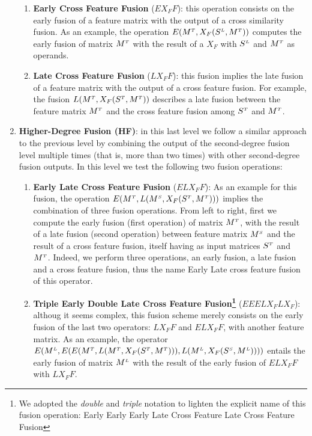 \begin{enumerate}
\begin{enumerate}
%
\item \textbf{Early Cross Feature Fusion} ($EX_FF$):  this operation consists on the early fusion of a feature matrix with the output of a cross similarity fusion. As an example, the operation $E(M^{\scriptscriptstyle T},X_F(S^{\scriptscriptstyle L}, M^{\scriptscriptstyle T}))$ computes the early fusion of matrix $M^{\scriptscriptstyle T}$ with the result of a $X_F$ with $S^{\scriptscriptstyle L}$ and $M^{\scriptscriptstyle T}$ as operands. 
%

\item \textbf{Late Cross Feature Fusion} ($LX_FF$): this fusion implies the late fusion of a feature matrix with the output of a cross feature fusion. For example, the fusion $L(M^{\scriptscriptstyle T}, X_F(S^{\scriptscriptstyle T}, M^{\scriptscriptstyle T}))$ describes a late fusion between the feature matrix $M^{\scriptscriptstyle T}$ and the cross feature fusion among $S^{\scriptscriptstyle T}$ and $M^{\scriptscriptstyle T}$.
\end{enumerate}

\item \textbf{Higher-Degree Fusion (HF)}: in this last level we follow a similar approach to the previous level by combining the output of the second-degree fusion level multiple times (that is, more than two times) with other second-degree fusion outputs. In this level we test the following two fusion operations:
\begin{enumerate}
\item \textbf{Early Late Cross Feature Fusion} ($ELX_FF$): As an example for this fusion, the operation $E(M^{\scriptscriptstyle T}, \allowbreak L(M^{\scriptscriptstyle S}, X_F(S^{\scriptscriptstyle T}, M^{\scriptscriptstyle T})))$ implies the combination of three fusion operations. From left to right, first we compute the early fusion (first operation) of  matrix $M^{\scriptscriptstyle T}$, with the result of a late fusion (second operation) between feature matrix $M^{\scriptscriptstyle S}$ and the result of a cross feature fusion, itself having as input matrices $S^{\scriptscriptstyle T}$ and $M^{\scriptscriptstyle T}$. Indeed, we perform three operations, an early fusion, a late fusion and a cross feature fusion, thus the name Early Late cross feature fusion of this operator.
\item \textbf{Triple Early Double Late Cross Feature Fusion\footnote{We adopted the \textit{double} and \textit{triple} notation to lighten the explicit name of this fusion operation: Early Early Early Late Cross Feature Late Cross Feature Fusion}}
 ($EEELX_FLX_F$): althoug it seems complex, this fusion scheme merely consists on the early fusion of the last two operators: $LX_FF$ and $ELX_FF$, with another feature matrix. As an example, the operator  $E(M^{\scriptscriptstyle L}, E(E(M^{\scriptscriptstyle T},  L(M^{\scriptscriptstyle T}, X_F(S^{\scriptscriptstyle T}, M^{\scriptscriptstyle T}))),\allowbreak L(M^{\scriptscriptstyle L}, X_F(S^{\scriptscriptstyle S}, M^{\scriptscriptstyle L}))))$ entails the early fusion of matrix $M^{\scriptscriptstyle L}$ with the result of the early fusion of $ELX_FF$ with $LX_FF$.
\end{enumerate}


\end{enumerate}

